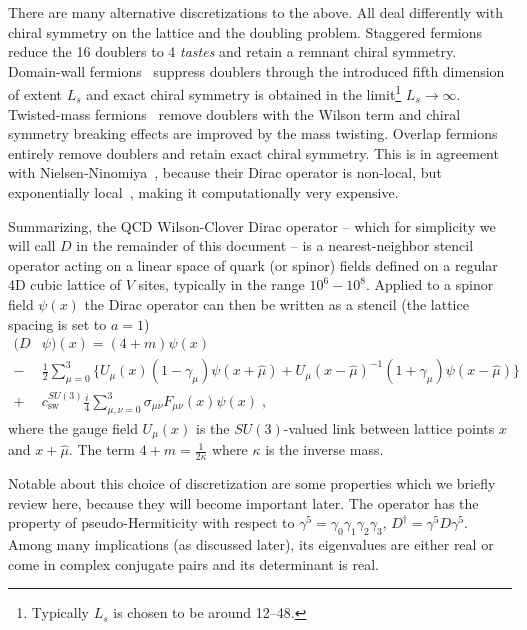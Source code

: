 There are many alternative discretizations to the above.
All deal differently with chiral symmetry on the lattice and the doubling problem.
Staggered fermions~\cite{PhysRevD.11.395} reduce the \num{16} doublers to \num{4} \emph{tastes} and retain a remnant  chiral symmetry.
Domain-wall fermions~\cite{Kaplan:1992bt,Shamir:1993zy} suppress doublers through the introduced fifth dimension of extent $L_s$ and exact chiral symmetry is obtained in the limit\footnote{Typically $L_s$ is chosen to be around \numrange{12}{48}.} $L_s \to \infty$.
Twisted-mass fermions~\cite{Frezzotti:2000nk} remove doublers with the Wilson term and chiral symmetry breaking effects are improved by the mass twisting.
Overlap fermions~\cite{Neuberger:1997fp,Neuberger:1998wv} entirely remove doublers and retain exact chiral symmetry.
This is in agreement with Nielsen-Ninomiya~\cite{Nielsen:1980rz,Nielsen:1981xu}, because their Dirac operator is non-local, but exponentially local~\cite{Hernandez:1998et,Boyle:2016imm}, making it computationally very expensive.

Summarizing, the QCD Wilson-Clover Dirac operator -- which for simplicity we will call $D$ in the remainder of this document -- is a nearest-neighbor stencil operator acting on a linear space of quark (or spinor) fields defined on a regular 4D cubic lattice of $V$ sites, typically in the range $10^6-10^8$.
Applied to a spinor field $\psi(x)$ the Dirac operator can then be written as a stencil (the lattice spacing is set to $a = 1$)
\begin{equation}
\begin{aligned} \label{eq:Dw}
(D &\psi)(x) = (4 + m) \psi(x) \\
-&\frac{1}{2} \sum_{\mu=0}^3 \Big\{
  U_{\mu}(x) (1-\gamma_{\mu}) \psi(x + \hat{\mu})
+ U_{\mu}(x-\hat{\mu})^{-1} (1+\gamma_{\mu}) \psi(x-\hat{\mu})
\Big\} \\
+&c_\mathrm{sw}^{SU(3)} \frac{i}{4} \sum_{\mu,\nu=0}^3 \sigma_{\mu \nu} F_{\mu \nu}(x) \psi(x) \;,
\end{aligned}
\end{equation}
where the gauge field $U_{\mu}(x)$ is the $SU(3)$-valued link between lattice points $x$ and $x + \hat{\mu}$.
The term $4+m = \frac{1}{2 \kappa}$ where $\kappa$ is the inverse mass.

Notable about this choice of discretization are some properties which we briefly review here, because they will become important later.
The operator has the property of pseudo-Hermiticity with respect to $\gamma^5 = \gamma_0 \gamma_1 \gamma_2 \gamma_3$, $D^{\dagger} = \gamma^{5} D \gamma^{5}$.
Among many implications (as discussed later), its eigenvalues are either real or come in complex conjugate pairs and its determinant is real.

